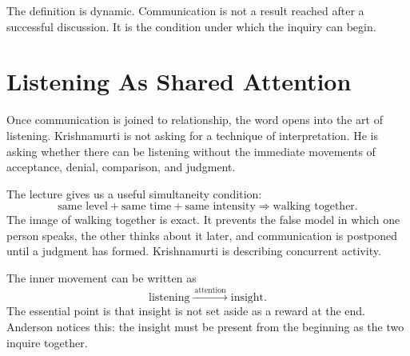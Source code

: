 The definition is dynamic. Communication is not a result reached after a successful discussion. It is the condition under which the inquiry can begin.

\section{Listening As Shared Attention}

Once communication is joined to relationship, the word opens into the art of listening. Krishnamurti is not asking for a technique of interpretation. He is asking whether there can be listening without the immediate movements of acceptance, denial, comparison, and judgment.

The lecture gives us a useful simultaneity condition:
\begin{equation}
\text{same level}
+
\text{same time}
+
\text{same intensity}
\Longrightarrow
\text{walking together}.
\end{equation}
The image of walking together is exact. It prevents the false model in which one person speaks, the other thinks about it later, and communication is postponed until a judgment has formed. Krishnamurti is describing concurrent activity.

The inner movement can be written as
\begin{equation}
\text{listening}
\xrightarrow{\ \text{attention}\ }
\text{insight}.
\end{equation}
The essential point is that insight is not set aside as a reward at the end. Anderson notices this: the insight must be present from the beginning as the two inquire together.

\begin{figure}
\centering
{}
\end{figure}

